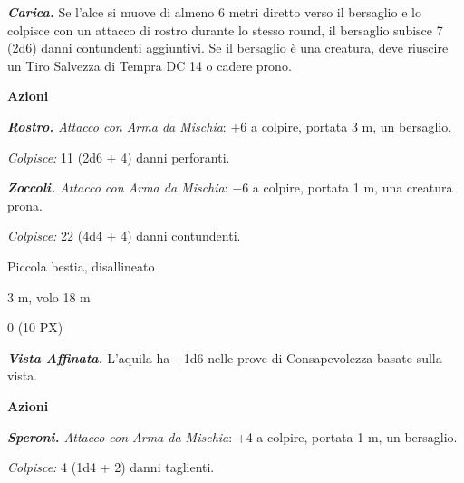 \begin{multicols}{2}
{\emph{\textbf{Carica.}} Se l'alce si muove di almeno 6 metri diretto verso il bersaglio e lo colpisce con un attacco di rostro durante lo stesso round, il bersaglio subisce 7 (2d6) danni contundenti aggiuntivi. Se il bersaglio è una creatura, deve riuscire un Tiro Salvezza di Tempra DC 14 o cadere prono.

\textbf{Azioni}

\emph{\textbf{Rostro.} Attacco con Arma da Mischia}: +6 a colpire, portata 3 m, un bersaglio.

\emph{Colpisce:} 11 (2d6 + 4) danni perforanti.

\emph{\textbf{Zoccoli.} Attacco con Arma da Mischia}: +6 a colpire, portata 1 m, una creatura prona.

\emph{Colpisce:} 22 (4d4 + 4) danni contundenti.

\begin{description}[noitemsep, topsep=0pt, parsep=0pt, partopsep=0pt, itemsep=1pt, leftmargin=2.35cm,  labelwidth=2.2cm, itemindent=0cm, listparindent=0pt] %
\setlength{\baselineskip}{10pt}
\item[\textbf{Taglia/Tipo}] Piccola bestia, disallineato
\item[\textbf{Caratt.}] 
\item[\textbf{Tiri Salvez.}] 
\item[\textbf{Punti Ferita}] 
\item[\textbf{Movimento}] 3 m, volo 18 m
\item[\textbf{Sfida}] 0 (10 PX)
\end{description}
\smallskip

\emph{\textbf{Vista Affinata.}} L'aquila ha +1d6 nelle prove di Consapevolezza basate sulla vista.

\textbf{Azioni}

\emph{\textbf{Speroni.} Attacco con Arma da Mischia}: +4 a colpire, portata 1 m, un bersaglio.

\emph{Colpisce:} 4 (1d4 + 2) danni taglienti.

}
\end{multicols}
